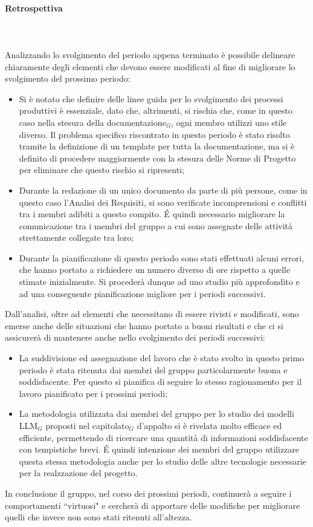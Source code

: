 \paragraph{Retrospettiva} \hspace{1cm} 
\\ \hspace{1cm} \\
Analizzando lo svolgimento del periodo appena terminato è possibile delineare chiaramente degli elementi che devono essere modificati al fine di migliorare lo svolgimento del prossimo periodo:
\begin{itemize}
    \item Si è notato che definire delle linee guida per lo svolgimento dei processi produttivi è essenziale, dato che, altrimenti, si rischia che, come in questo caso nella stesura della documentazione$_G$, ogni membro utilizzi uno stile diverso. Il problema specifico riscontrato in questo periodo è stato risolto tramite la definizione di un template per tutta la documentazione, ma si è definito di procedere maggiormente con la stesura delle Norme di Progetto per eliminare che questo rischio si ripresenti;
    \item Durante la redazione di un unico documento da parte di più persone, come in questo caso l'Analisi dei Requisiti, si sono verificate incomprensioni e conflitti tra i membri adibiti a questo compito. \'E quindi necessario migliorare la comunicazione tra i membri del gruppo a cui sono assegnate delle attività strettamente collegate tra loro;
    \item Durante la pianificazione di questo periodo sono stati effettuati alcuni errori, che hanno portato a richiedere un numero diverso di ore rispetto a quelle stimate inizialmente. Si procederà dunque ad uno studio più approfondito e ad una conseguente pianificazione migliore per i periodi successivi.
\end{itemize}
Dall'analisi, oltre ad elementi che necessitano di essere rivisti e modificati, sono emerse anche delle situazioni che hanno portato a buoni risultati e che ci si assicurerà di mantenere anche nello svolgimento dei periodi successivi:
\begin{itemize}
    \item La suddivisione ed assegnazione del lavoro che è stato svolto in questo primo periodo è stata ritenuta dai membri del gruppo particolarmente buona e soddisfacente. Per questo si pianifica di seguire lo stesso ragionamento per il lavoro pianificato per i prossimi periodi;
    \item La metodologia utilizzata dai membri del gruppo per lo studio dei modelli LLM$_G$ proposti nel capitolato$_G$ d'appalto si è rivelata molto efficace ed efficiente, permettendo di ricercare una quantità di informazioni soddisfacente con tempistiche brevi. \'E quindi intenzione dei membri del gruppo utilizzare questa stessa metodologia anche per lo studio delle altre tecnologie necessarie per la realzzazione del progetto.
\end{itemize}
In conclusione il gruppo, nel corso dei prossimi periodi, continuerà a seguire i comportamenti ``virtuosi" e cercherà di apportare delle modifiche per migliorare quelli che invece non sono stati ritenuti all'altezza.

